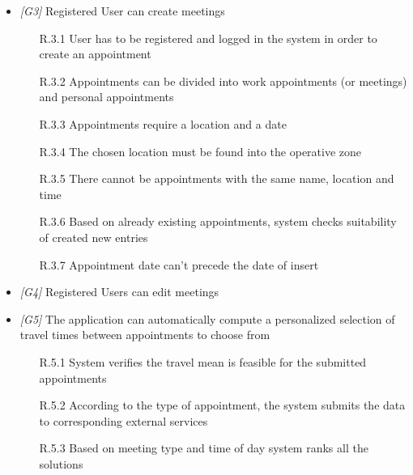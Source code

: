 \begin{itemize}
\item \textit{[G3]} Registered User can create meetings 

 \begin{itemize}
                        \item [R.3.1] User has to be registered and logged in the system in order to create an
appointment
                        \item [R.3.2] Appointments can be divided into work appointments (or meetings) and personal appointments
                        \item [R.3.3] Appointments require a location and a date
                        \item [R.3.4] The chosen location must be found into the operative zone
                        \item [R.3.5] There cannot be appointments with the same name, location and time
                        \item [R.3.6] Based on already existing appointments, system checks suitability of created new entries
                        \item [R.3.7] Appointment date can't precede the date of insert
                  \end{itemize}
                  
\item \textit{[G4]} Registered Users can edit meetings

                  \begin{itemize}
                       
                  \end{itemize}

\item \textit{[G5]} The application can automatically compute a personalized selection of travel times between appointments to choose from

                  \begin{itemize}
                        \item [R.5.1] System verifies the travel mean is feasible for the submitted appointments
                        \item [R.5.2] According to the type of appointment, the system submits the data to corresponding external services
                        \item [R.5.3] Based on meeting type and time of day system ranks all the solutions
                  \end{itemize}
                  

\end{itemize}
